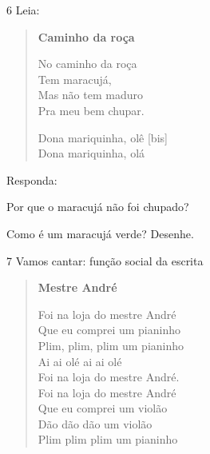 \num{6} Leia:


\begin{verse}
\textbf{Caminho da roça}

No caminho da roça\\
Tem maracujá,\\
Mas não tem maduro\\
Pra meu bem chupar.

Dona mariquinha, olê {[}bis{]}\\
Dona mariquinha, olá
\end{verse}


Responda:

\begin{escolha}
\item Por que o maracujá não foi chupado?


\item Como é um maracujá verde? Desenhe.

\begin{mdframed}[linewidth=2pt,linecolor=salmao,roundcorner=10pt]
\vspace{5cm}
\end{mdframed}
\end{escolha}

\num{7} Vamos cantar: função social da escrita


\begin{verse}
\textbf{Mestre André}

Foi na loja do mestre André\\
Que eu comprei um pianinho\\
Plim, plim, plim um pianinho\\
Ai ai olé ai ai olé\\
Foi na loja do mestre André.\\
Foi na loja do mestre André\\
Que eu comprei um violão\\
Dão dão dão um violão\\
Plim plim plim um pianinho
\end{verse}

